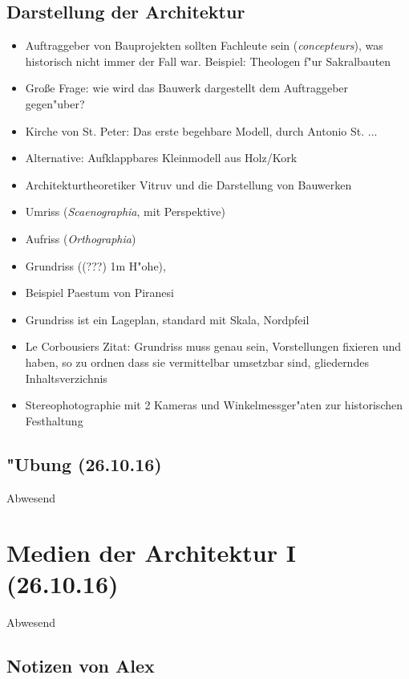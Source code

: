 \documentclass[]{scrartcl}
\begin{document}
\subsection{Darstellung der Architektur}

\begin{itemize}
    \item Auftraggeber von Bauprojekten sollten Fachleute sein (\emph{concepteurs}), was historisch nicht immer der Fall war. Beispiel: Theologen f"ur Sakralbauten
    \item Gro\ss e Frage: wie wird das Bauwerk dargestellt dem Auftraggeber gegen"uber?
    \item Kirche von St. Peter: Das erste begehbare Modell, durch Antonio St. ... 
    \item Alternative: Aufklappbares Kleinmodell aus Holz/Kork
    \item Architekturtheoretiker Vitruv und die Darstellung von Bauwerken
    \item Umriss (\emph{Scaenographia}, mit Perspektive)
    \item Aufriss (\emph{Orthographia})
    \item Grundriss ({\color{red}(???)} 1m H"ohe),
    \item Beispiel Paestum von Piranesi
    \item Grundriss ist ein Lageplan, standard mit Skala, Nordpfeil
    \item Le Corbousiers Zitat: Grundriss muss genau sein, Vorstellungen fixieren und haben, so zu ordnen dass sie vermittelbar umsetzbar sind, gliederndes Inhaltsverzichnis
    \item Stereophotographie mit 2 Kameras und Winkelmessger"aten zur historischen Festhaltung 
\end{itemize}

\subsection{"Ubung  (26.10.16)}
Abwesend

\section{Medien der Architektur I\\(26.10.16)}

Abwesend

\subsection{Notizen von Alex}
\end{document}
